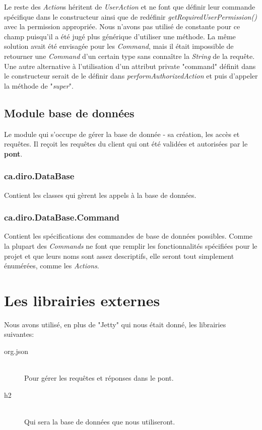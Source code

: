 \documentclass[10pt,a4paper]{report}
\begin{document}
\begin{flushleft}
\begin{description}
\end{description}
\bigskip
Le reste des \emph{Action}s héritent de \emph{UserAction} et ne font que définir leur commande spécifique dans le constructeur ainsi que de redéfinir \emph{getRequiredUserPermission()} avec la permission appropriée. Nous n'avons pas utilisé de constante pour ce champ puisqu'il a été jugé plus générique d'utiliser une méthode. La même solution avait été envisagée pour les \emph{Command}, mais il était impossible de retourner une \emph{Command} d'un certain type sans connaître la \emph{String} de la requête.\\
\medskip
Une autre alternative à l'utilisation d'un attribut private "command" définit dans le constructeur serait de le définir dans \emph{performAuthorizedAction} et puis d'appeler la méthode de "\emph{super}".\\
\bigskip
\subsection*{Module base de données}
Le module qui s'occupe de gérer la base de donnée - sa création, les accès et requêtes. Il reçoit les requêtes du client qui ont été validées et autorisées par le \textbf{pont}.\\
\bigskip
\subsubsection*{ca.diro.DataBase}
Contient les classes qui gèrent les appels à la base de données.\\
\bigskip
\subsubsection*{ca.diro.DataBase.Command}
Contient les spécifications des commandes de base de données possibles. Comme la plupart des \emph{Commands} ne font que remplir les fonctionnalités spécifiées pour le projet et que leurs noms sont assez descriptifs, elle seront tout simplement énumérées, comme les \emph{Actions}.\\
\bigskip
\section{Les librairies externes}
Nous avons utilisé, en plus de "Jetty" qui nous était donné, les librairies suivantes:\\
\begin{description}
\item[org.json] \hfill \\ Pour gérer les requêtes et réponses dans le pont.
\item[h2] \hfill \\ Qui sera la base de données que nous utiliseront.
\end{description}
\end{flushleft}
\end{document}
